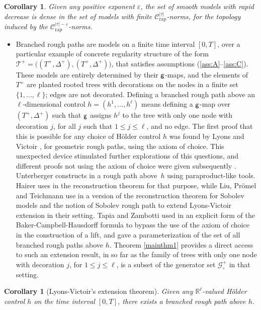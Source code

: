 \documentclass[11pt]{article}
\numberwithin{equation}{section}
\theoremstyle{plain}
\newtheorem{cor}[thm]{Corollary}
\theoremstyle{definition}
\newcommand{\rap}{\mathrm{rap}}
\let\epsilon\varepsilon
\newcommand{\bbR}{\mathbb{R}}
\newcommand{\mcC}{\mathcal{C}}
\newcommand{\mcG}{\mathcal{G}}
\begin{document}
\begin{cor} \label{CorDensity}
Given any positive exponent $\epsilon$, the set of smooth models with rapid decrease
is dense in the set of models with finite $\mcC_{\rap}^{|\tau|}$-norms, for the topology induced by the $\mcC_{\rap}^{|\tau|-\epsilon}$-norms.
\end{cor}

\begin{itemize}
\item
Branched rough paths are models on a finite time interval $[0,T]$, over a particular example of concrete regularity structure of the form $\mathscr{T}^+=\bigl((T^+,\Delta^+),(T^+,\Delta^+)\bigr)$, that satisfies assumptions (\ref{ass:A}--\ref{ass:C}). These models are entirely determined by their $\sf g$\nobreakdash-maps, and the elements of $T^+$ are planted rooted trees with decorations on the nodes in a finite set $\{1,\dots,\ell\}$; edges are not decorated. Defining a branched rough path above an $\ell$-dimensional control $h=(h^1,\dots,h^\ell)$ means defining a $\sf g$-map over $(T^+,\Delta^+)$ such that $\sf g$ assigns $h^j$ to the tree with only one node with decoration $j$, for all $j$ such that $1\leq j\leq \ell$, and no edge. The first proof that this is possible for any choice of Hölder control $h$ was found by Lyons and Victoir \cite{LyonsVictoir}, for geometric rough paths, using the axiom of choice. This unexpected device stimulated further explorations of this questions, and different proofs not using the axiom of choice were given subsequently \cite{Unterberger, Hai, TZ18, LPT18}. Unterberger constructs in \cite{Unterberger} a rough path above~$h$ using paraproduct-like tools. Hairer uses in \cite{Hai} the reconstruction theorem for that purpose, while Liu, Prömel and Teichmann use in \cite{LPT18} a version of the reconstruction theorem for Sobolev models and the notion of Sobolev rough path to extend Lyons-Victoir extension in their setting. Tapia and Zambotti used in \cite{TZ18} an explicit form of the Baker-Campbell-Hausdorff formula to bypass the use of the axiom of choice in the construction of a lift, and gave a parameterization of the set of all branched rough paths above $h$. Theorem \ref{mainthm1} provides a direct access to such an extension result, in so far as the family of trees with only one node with decoration $j$, for $1\leq j\leq\ell$, is a subset of the generator set $\mcG^+_\circ$ in that setting.
\end{itemize}

\begin{cor}[Lyons-Victoir's extension theorem] \label{CorLyonsVictoir}
Given any $\bbR^\ell$-valued Hölder control $h$ on the time interval $[0,T]$, there exists a branched rough path above $h$.
\end{cor}
\end{document}
